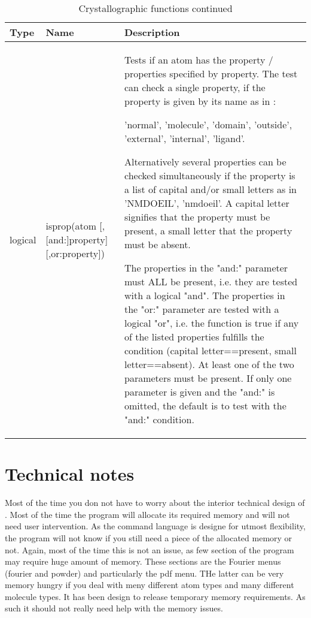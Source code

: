 \begin{table}[!tbh]
\begin{tabularx}{\textwidth}{|p{10mm}|p{47mm}|X|}
  \hline
  {\bf Type} & {\bf Name} & {\bf Description} \\
  \hline\hline
   logical & \raggedright isprop(atom [,[and:]property] [,or:property]) &
       Tests if an atom has the property / properties specified by
       property. The test can check a single property, if the 
       property is given by its name as in :

       'normal', 'molecule', 'domain', 'outside', 'external', 'internal',
       'ligand'. 

       Alternatively several properties can be checked 
       simultaneously if the property is a list of capital and/or 
       small letters as in 'NMDOEIL', 'nmdoeil'. A capital letter 
       signifies that the property must be present, a small letter 
       that the property must be absent. 

       The properties in the "and:" parameter must ALL be present, 
       i.e. they are tested with a logical "and". The properties in
       the "or:" parameter are tested with a logical "or", i.e. the
       function is true if any of the listed properties fulfills
       the condition (capital letter==present, small letter==absent).
       At least one of the two parameters must be present. If only 
       one parameter is given and the "and:" is omitted, the default
       is to test with the "and:" condition. \\
  \hline
\end{tabularx}
\caption{\label{func-cryst2}Crystallographic functions continued}
\end{table}

\section{Technical notes \label{tec}}

Most of the time you don not have to worry about the interior 
technical design of \discus. Most of the time the program will 
allocate its required memory and will not need user intervention.
As the command language is designe for utmost flexibility, the 
program will not know if you still need a piece of the allocated
memory or not. Again, most of the time this is not an issue, as 
few section of the program may require huge amount of memory. 
These sections are the Fourier menus (fourier and powder) and
particularly the pdf menu. THe latter can be very memory hungry 
if you deal with meny different atom types and many different 
molecule types. It has been design to 
release temporary memory requirements. As such it should not really
need help with the memory issues. 

